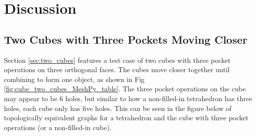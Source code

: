 \documentclass[ma]{uncgdissertationexp}
\theoremstyle{plain}
\theoremstyle{definition}
\theoremstyle{remark}
\begin{document}
\chapter{Discussion}
\section{Two Cubes with Three Pockets Moving Closer}
\par Section \ref{sec:two_cubes} features a test case of two cubes with three pocket operations on three orthogonal faces. The cubes move closer together until combining to form one object, as shown in Fig \ref{fig:cube_two_cubes_MeshPy_table}. The three pocket operations on the cube may appear to be 6 holes, but similar to how a non-filled-in tetrahedron has three holes, each cube only has five holes. This can be seen in the figure below of topologically equivalent graphs for a tetrahedron and the cube with three pocket operations (or a non-filled-in cube).
\end{document}
